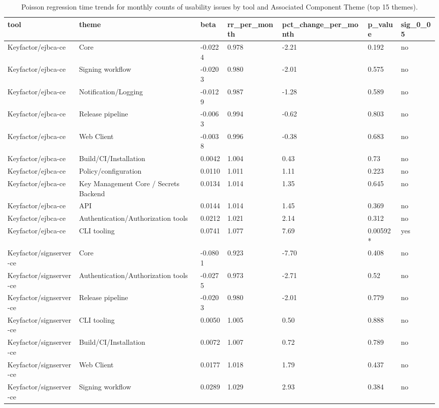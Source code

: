 \begin{table}[t]
\centering
\caption{Poisson regression time trends for monthly counts of usability issues by tool and Associated Component Theme (top 15 themes).}
\label{tab:poisson-associated_component_theme}
\scriptsize
\begin{tabular}{lllllll}
\hline
tool & theme & beta & rr\_per\_month & pct\_change\_per\_month & p\_value & sig\_0\_05 \\
\hline
Keyfactor/ejbca-ce & Core & -0.0224 & 0.978 & -2.21 & 0.192 & no \\
Keyfactor/ejbca-ce & Signing workflow & -0.0203 & 0.980 & -2.01 & 0.575 & no \\
Keyfactor/ejbca-ce & Notification/Logging & -0.0129 & 0.987 & -1.28 & 0.589 & no \\
Keyfactor/ejbca-ce & Release pipeline & -0.0063 & 0.994 & -0.62 & 0.803 & no \\
Keyfactor/ejbca-ce & Web Client & -0.0038 & 0.996 & -0.38 & 0.683 & no \\
Keyfactor/ejbca-ce & Build/CI/Installation & 0.0042 & 1.004 & 0.43 & 0.73 & no \\
Keyfactor/ejbca-ce & Policy/configuration & 0.0110 & 1.011 & 1.11 & 0.223 & no \\
Keyfactor/ejbca-ce & Key Management Core / Secrets Backend & 0.0134 & 1.014 & 1.35 & 0.645 & no \\
Keyfactor/ejbca-ce & API & 0.0144 & 1.014 & 1.45 & 0.369 & no \\
Keyfactor/ejbca-ce & Authentication/Authorization tools & 0.0212 & 1.021 & 2.14 & 0.312 & no \\
Keyfactor/ejbca-ce & CLI tooling & 0.0741 & 1.077 & 7.69 & 0.00592* & yes \\
Keyfactor/signserver-ce & Core & -0.0801 & 0.923 & -7.70 & 0.408 & no \\
Keyfactor/signserver-ce & Authentication/Authorization tools & -0.0275 & 0.973 & -2.71 & 0.52 & no \\
Keyfactor/signserver-ce & Release pipeline & -0.0203 & 0.980 & -2.01 & 0.779 & no \\
Keyfactor/signserver-ce & CLI tooling & 0.0050 & 1.005 & 0.50 & 0.888 & no \\
Keyfactor/signserver-ce & Build/CI/Installation & 0.0072 & 1.007 & 0.72 & 0.789 & no \\
Keyfactor/signserver-ce & Web Client & 0.0177 & 1.018 & 1.79 & 0.437 & no \\
Keyfactor/signserver-ce & Signing workflow & 0.0289 & 1.029 & 2.93 & 0.384 & no \\

\end{tabular}
\end{table}
